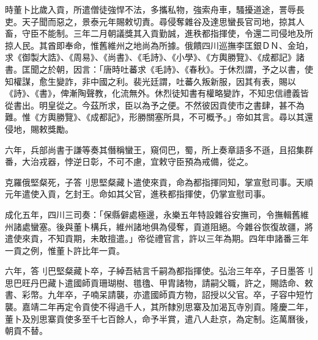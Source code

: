 \begin{pinyinscope}
時董卜比歲入貢，所遣僧徒強悍不法，多攜私物，強索舟車，騷擾道途，詈辱長吏。天子聞而惡之，景泰元年賜敕切責。尋侵奪雜谷及達思蠻長官司地，掠其人畜，守臣不能制。三年二月朝議獎其入貢勤誠，進秩都指揮使，令還二司侵地及所掠人民。其酋即奉命，惟舊維州之地尚為所據。俄饋四川巡撫李匡銀ＤＮ、金珀，求《御製大誥》、《周易》、《尚書》、《毛詩》、《小學》、《方輿勝覽》、《成都記》諸書。匡聞之於朝，因言：「唐時吐蕃求《毛詩》、《春秋》。于休烈謂，予之以書，使知權謀，愈生變詐，非中國之利。裴光廷謂，吐蕃久叛新服，因其有表，賜以《詩》、《書》，俾漸陶聲教，化流無外。休烈徒知書有權略變詐，不知忠信禮義皆從書出。明皇從之。今茲所求，臣以為予之便。不然彼因貢使市之書肆，甚不為難。惟《方輿勝覽》、《成都記》，形勝關塞所具，不可概予。」帝如其言。尋以其還侵地，賜敕獎勵。

六年，兵部尚書于謙等奏其僭稱蠻王，窺伺巴，蜀，所上奏章語多不遜，且招集群番，大治戎器，悖逆日彰，不可不慮，宜敕守臣預為戒備，從之。

克羅俄堅粲死，子答刂思堅粲藏卜遣使來貢，命為都指揮同知，掌宣慰司事。天順元年遣使入貢，乞封王。命如其父官，進秩都指揮使，仍掌宣慰司事。

成化五年，四川三司奏：「保縣僻處極邊，永樂五年特設雜谷安撫司，令撫輯舊維州諸處蠻塞。後與董卜構兵，維州諸地俱為侵奪，貢道阻絕。今雜谷恢復故疆，將遣使來貢，不知貢期，未敢擅遣。」帝從禮官言，許以三年為期。四年申諸番三年一貢之例，惟董卜許比年一貢。

六年，答刂巴堅粲藏卜卒，子綽吾結言千嗣為都指揮使。弘治三年卒，子日墨答刂思巴旺丹巴藏卜遣國師貢珊瑚樹、氆氌、甲胄諸物，請嗣父職，許之，賜誥命、敕書、彩幣。九年卒，子喃呆請襲，亦遣國師貢方物，詔授以父官。卒，子容中短竹襲。嘉靖二年再定令貢使不得過千人，其所隸別思寨及加渴瓦寺別貢。隆慶二年，董卜及別思寨貢使多至千七百餘人，命予半賞，遣八人赴京，為定制。迄萬曆後，朝貢不替。


\end{pinyinscope}